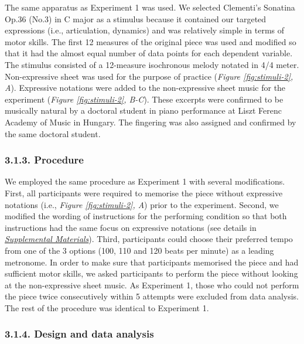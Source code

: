 \documentclass[
  english,
  man,floatsintext]{apa6}
\begin{document}
The same apparatus as Experiment 1 was used. We selected Clementi's Sonatina Op.36 (No.3) in C major as a stimulus because it contained our targeted expressions (i.e., articulation, dynamics) and was relatively simple in terms of motor skills. The first 12 measures of the original piece was used and modified so that it had the almost equal number of data points for each dependent variable. The stimulus consisted of a 12-measure isochronous melody notated in 4/4 meter. Non-expressive sheet was used for the purpose of practice (\emph{Figure \ref{fig:stimuli-2}, A}). Expressive notations were added to the non-expressive sheet music for the experiment (\emph{Figure \ref{fig:stimuli-2}, B-C}). These excerpts were confirmed to be musically natural by a doctoral student in piano performance at Liszt Ferenc Academy of Music in Hungary. The fingering was also assigned and confirmed by the same doctoral student.

\hypertarget{procedure-2}{%
\subsubsection{3.1.3. Procedure}\label{procedure-2}}

We employed the same procedure as Experiment 1 with several modifications. First, all participants were required to memorise the piece without expressive notations (i.e., \emph{Figure \ref{fig:stimuli-2}, A}) prior to the experiment. Second, we modified the wording of instructions for the performing condition so that both instructions had the same focus on expressive notations (see details in \emph{\protect\hyperlink{supplemental}{Supplemental Materials}}). Third, participants could choose their preferred tempo from one of the 3 options (100, 110 and 120 beats per minute) as a leading metronome. In order to make sure that participants memorised the piece and had sufficient motor skills, we asked participants to perform the piece without looking at the non-expressive sheet music. As Experiment 1, those who could not perform the piece twice consecutively within 5 attempts were excluded from data analysis. The rest of the procedure was identical to Experiment 1.

\hypertarget{design-and-data-analysis-1}{%
\subsubsection{3.1.4. Design and data analysis}\label{design-and-data-analysis-1}}
\end{document}
